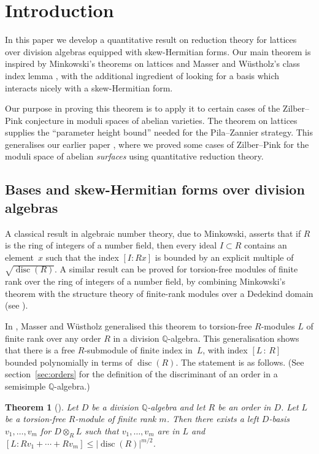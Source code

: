 \documentclass[11pt]{article}
\numberwithin{equation}{section}
\newcommand{\bQ}{\mathbb{Q}}
\DeclareMathOperator{\disc}{disc}
\newcommand{\abs}[1]{\lvert #1 \rvert}
\newtheorem{theorem}[lemma]{Theorem}
\begin{document}

\section{Introduction}

In this paper we develop a quantitative result on reduction theory for lattices over division algebras equipped with skew-Hermitian forms. Our main theorem is inspired by Minkowski's theorems on lattices and Masser and Wüstholz's class index lemma \cite{MW95}, with the additional ingredient of looking for a basis which interacts nicely with a skew-Hermitian form.

Our purpose in proving this theorem is to apply it to certain cases of the Zilber--Pink conjecture in moduli spaces of abelian varieties. The theorem on lattices supplies the ``parameter height bound'' needed for the Pila--Zannier strategy.
This generalises our earlier paper \cite{QRTUI}, where we proved some cases of Zilber--Pink for the moduli space of abelian \textit{surfaces} using quantitative reduction theory.

\subsection{Bases and skew-Hermitian forms over division algebras}

A classical result in algebraic number theory, due to Minkowski, asserts that if $R$ is the ring of integers of a number field, then every ideal $I \subset R$ contains an element~$x$ such that the index $[I:Rx]$ is bounded by an explicit multiple of $\sqrt{\disc(R)}$.
A similar result can be proved for torsion-free modules of finite rank over the ring of integers of a number field, by combining Minkowski's theorem with the structure theory of finite-rank modules over a Dedekind domain (see \cite[\S 22, Ex.\,6]{CR62}).

In \cite{MW95}, Masser and Wüstholz generalised this theorem to torsion-free $R$\nobreakdash-mod\-ules $L$ of finite rank over any order $R$ in a division $\bQ$-algebra.
This generalisation shows that there is a free $R$-submodule of finite index in~$L$, with index $[L\,{:}\,R]$ bounded polynomially in terms of $\disc(R)$.
The statement is as follows. (See section~\ref{sec:orders} for the definition of the discriminant of an order in a semisimple $\bQ$-algebra.)

\begin{theorem}[{\cite[Chap.\,2, Class Index Lem.]{MW95}}]\label{minkowski-general-index}
Let $D$ be a division $\bQ$-algebra and let $R$ be an order in $D$.
Let $L$ be a torsion-free $R$-module of finite rank $m$.
Then there exists a left $D$-basis $v_1, \dotsc, v_m$ for $D \otimes_R L$ such that $v_1, \dotsc, v_m$ are in $L$ and $[L:Rv_1 + \dotsb + Rv_m] \leq \abs{\disc(R)}^{m/2}$.
\end{theorem}
\end{document}
